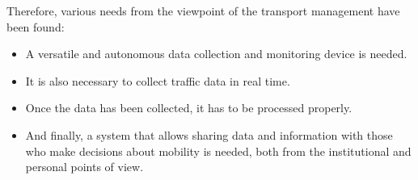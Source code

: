 \documentclass{llncs}
\begin{document}
Therefore, various needs from the viewpoint of the transport management have been found:


\begin{itemize}
  \item A versatile and autonomous data collection and monitoring device is needed.
  \item It is also necessary to collect traffic data in real time.
  \item Once the data has been collected, it has to be processed properly.
  \item And finally, a system that allows sharing data and information with those who make decisions about mobility is needed, both from the institutional and personal points of view.
\end{itemize}
\end{document}

